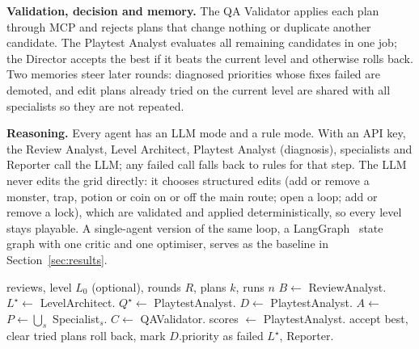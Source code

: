 \documentclass[conference]{IEEEtran}
\begin{document}
\textbf{Validation, decision and memory.} The QA Validator applies each plan through MCP and rejects
plans that change nothing or duplicate another candidate. The Playtest Analyst evaluates all
remaining candidates in one job; the Director accepts the best if it beats the current level and
otherwise rolls back. Two memories steer later rounds: diagnosed priorities whose fixes failed are
demoted, and edit plans already tried on the current level are shared with all specialists so they
are not repeated.

\textbf{Reasoning.} Every agent has an LLM mode and a rule mode. With an API key, the Review Analyst,
Level Architect, Playtest Analyst (diagnosis), specialists and Reporter call the LLM; any failed call
falls back to rules for that step. The LLM never edits the grid directly: it chooses structured edits
(add or remove a monster, trap, potion or coin on or off the main route; open a loop; add or remove a
lock), which are validated and applied deterministically, so every level stays playable. A
single-agent version of the same loop, a LangGraph~\cite{langgraph} state graph with one critic and
one optimiser, serves as the baseline in Section~\ref{sec:results}.

\begin{algorithm}[t]
\caption{Director: one optimisation run (all calls are A2A tasks)}
\label{alg:team}
\small
\begin{algorithmic}[1]
\Require reviews, level $L_0$ (optional), rounds $R$, plans $k$, runs $n$
\State $B \gets$ ReviewAnalyst.
\State $L^\star \gets$ LevelArchitect.
\State $Q^\star \gets$ PlaytestAnalyst. 
  \State $D \gets$ PlaytestAnalyst.
  \State $A \gets$  
  \State $P \gets \bigcup_s$ Specialist$_s$. 
  \State $C \gets$ QAValidator. 
  \State scores $\gets$ PlaytestAnalyst. 
   accept best, clear tried plans
  \Else{} roll back, mark $D$.priority as failed \EndIf
\EndFor
\State \Return $L^\star$, Reporter.
\end{algorithmic}
\end{algorithm}
\end{document}
